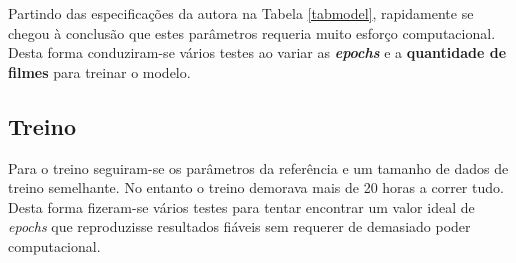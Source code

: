 \documentclass{article}
\begin{document}
Partindo das especificações da autora na Tabela \ref{tabmodel}, rapidamente se chegou à conclusão que estes parâmetros requeria muito esforço computacional. Desta forma conduziram-se vários testes ao variar as \textbf{\textit{epochs}} e a \textbf{quantidade de filmes} para treinar o modelo.
\subsection{Treino}
Para o treino seguiram-se os parâmetros da referência \cite{abonia2020seq2seq} e um tamanho de dados de treino semelhante. No entanto o treino demorava mais de 20 horas a correr tudo. Desta forma fizeram-se vários testes para tentar encontrar um valor ideal de \textit{epochs} que reproduzisse resultados fiáveis sem requerer de demasiado poder computacional.
\end{document}
